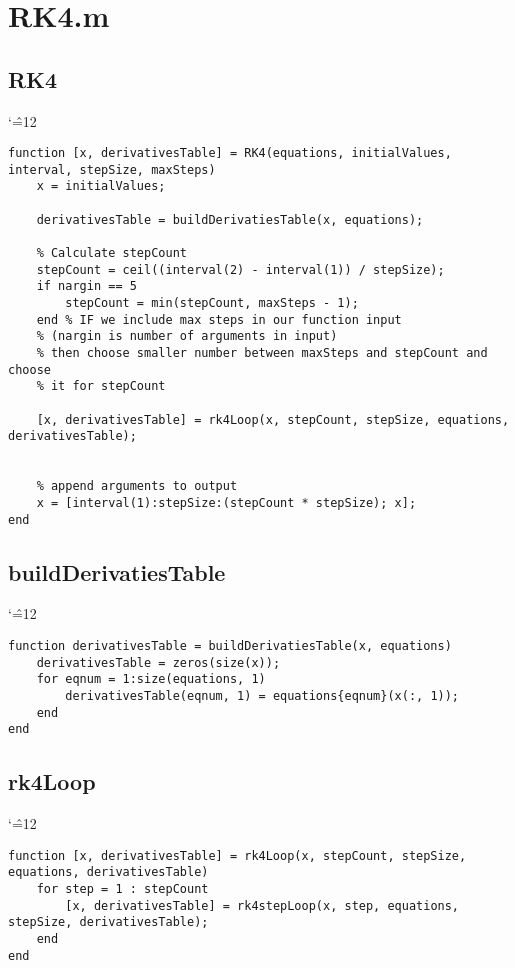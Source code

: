 \documentclass[12pt]{report}
\newenvironment{simplechar}{%
   \catcode`\^=12
}{}
\begin{document}
\section{RK4.m}
\subsection{RK4}
\begin{simplechar}
\begin{lstlisting}
function [x, derivativesTable] = RK4(equations, initialValues, interval, stepSize, maxSteps)
    x = initialValues;

    derivativesTable = buildDerivatiesTable(x, equations);

    % Calculate stepCount
    stepCount = ceil((interval(2) - interval(1)) / stepSize);
    if nargin == 5
        stepCount = min(stepCount, maxSteps - 1);
    end % IF we include max steps in our function input
    % (nargin is number of arguments in input)
    % then choose smaller number between maxSteps and stepCount and choose
    % it for stepCount

    [x, derivativesTable] = rk4Loop(x, stepCount, stepSize, equations, derivativesTable);


    % append arguments to output
    x = [interval(1):stepSize:(stepCount * stepSize); x];
end
\end{lstlisting}
\end{simplechar}

\subsection{buildDerivatiesTable}
\begin{simplechar}
\begin{lstlisting}
function derivativesTable = buildDerivatiesTable(x, equations)
    derivativesTable = zeros(size(x));
    for eqnum = 1:size(equations, 1)
        derivativesTable(eqnum, 1) = equations{eqnum}(x(:, 1));
    end
end
\end{lstlisting}
\end{simplechar}

\subsection{rk4Loop}
\begin{simplechar}
\begin{lstlisting}
function [x, derivativesTable] = rk4Loop(x, stepCount, stepSize, equations, derivativesTable)
    for step = 1 : stepCount
        [x, derivativesTable] = rk4stepLoop(x, step, equations, stepSize, derivativesTable);
    end
end
\end{lstlisting}
\end{simplechar}
\end{document}

